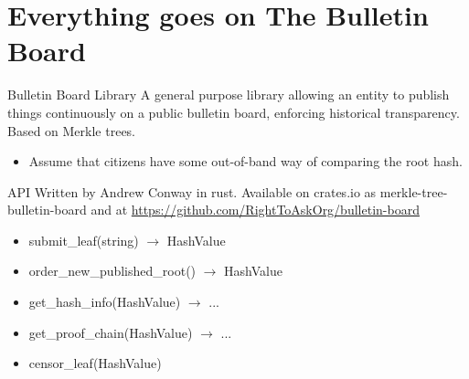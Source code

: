 \documentclass[10pt,xcolor=svgnames,169]{beamer} %
\begin{document}
		\section{Everything goes on The Bulletin Board}
	
	
	\begin{frame}[fragile]{Bulletin Board Library}
		A general purpose library allowing an entity to publish
		things continuously on a public bulletin board, enforcing historical transparency.
		Based on Merkle trees.
		
		\begin{itemize}
			\item Assume that citizens have some out-of-band way of comparing the root hash.
		\end{itemize}
	\end{frame}
	
	
	\begin{frame}[fragile]{API}
		Written by Andrew Conway in rust. Available on crates.io as merkle-tree-bulletin-board
		and at \url{https://github.com/RightToAskOrg/bulletin-board}
		\begin{itemize}
			\item submit\_leaf(string) $\rightarrow$ HashValue
			\item order\_new\_published\_root() $\rightarrow$ HashValue
			\item get\_hash\_info(HashValue) $\rightarrow$ ...
			\item get\_proof\_chain(HashValue) $\rightarrow$ ...
			\item censor\_leaf(HashValue)
		\end{itemize}
		
	\end{frame}
	
\end{document}
